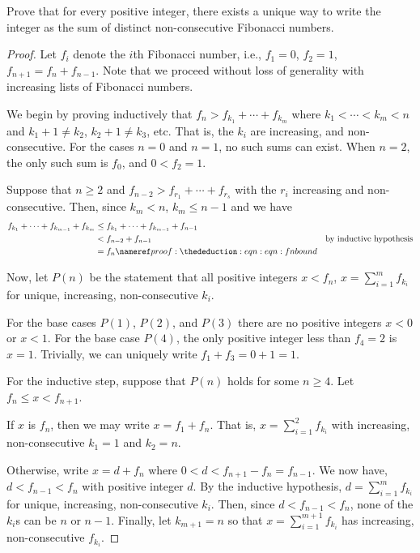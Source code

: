 \documentclass{agony}
\begin{document}

\question Prove that for every positive integer,
there exists a unique way to write the integer as
the sum of distinct non-consecutive Fibonacci numbers.

\begin{proof}
  Let $f_i$ denote the $i$th Fibonacci number, i.e.,
  $f_1 = 0$, $f_2 = 1$, $f_{n+1} = f_n + f_{n-1}$.
  Note that we proceed without loss of generality
  with increasing lists of Fibonacci numbers.

  We begin by proving inductively that
  $f_n > f_{k_1} + \dotsb + f_{k_m}$ where $k_1 < \dotsb < k_m < n$
  and $k_1 + 1 \neq k_2$, $k_2 + 1 \neq k_3$, etc.
  That is, the $k_i$ are increasing, and non-consecutive.
  For the cases $n=0$ and $n=1$, no such sums can exist.
  When $n=2$, the only such sum is $f_0$, and $0 < f_2 = 1$.

  Suppose that $n \geq 2$ and $f_{n-2} > f_{r_1} + \dotsb + f_{r_s}$
  with the $r_i$ increasing and non-consecutive.
  Then, since $k_m < n$, $k_m \leq n-1$ and we have
  \begin{align*}
    f_{k_1} + \dotsb + f_{k_{m-1}} + f_{k_m}
     & \leq f_{k_1} + \dotsb + f_{k_{m-1}} + f_{n-1} \\
     & < f_{n-2} + f_{n-1} \IH                       \\
     & = f_n \nr{eqn:fnbound}
  \end{align*}

  Now, let $P(n)$ be the statement that all positive integers $x < f_n$,
  $x = \sum_{i=1}^m f_{k_i}$ for unique, increasing, non-consecutive $k_i$.

  For the base cases $P(1)$, $P(2)$, and $P(3)$ there are no positive integers $x < 0$ or $x < 1$.
  For the base case $P(4)$, the only positive integer less than $f_4 = 2$ is $x = 1$.
  Trivially, we can uniquely write $f_1 + f_3 = 0 + 1 = 1$.

  For the inductive step, suppose that $P(n)$ holds for some $n \geq 4$.
  Let $f_n \leq x < f_{n+1}$.

  If $x$ is $f_n$, then we may write $x = f_1 + f_n$.
  That is, $x = \sum_{i=1}^2 f_{k_i}$
  with increasing, non-consecutive $k_1 = 1$ and $k_2 = n$.

  Otherwise, write $x = d + f_n$ where $0 < d < f_{n+1} - f_n = f_{n-1}$.
  We now have, $d < f_{n-1} < f_n$ with positive integer $d$.
  By the inductive hypothesis, $d = \sum_{i=1}^m f_{k_i}$
  for unique, increasing, non-consecutive $k_i$.
  Then, since $d < f_{n-1} < f_n$, none of the $k_i$s can be $n$ or $n-1$.
  Finally, let $k_{m+1} = n$ so that $x = \sum_{i=1}^{m+1} f_{k_i}$
  has increasing, non-consecutive $f_{k_i}$.


\end{proof}
\end{document}
